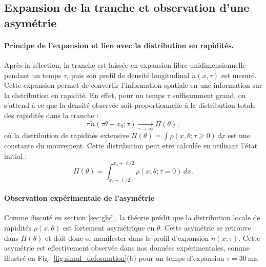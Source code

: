 \subsection{Expansion de la tranche et observation d’une asymétrie}

\paragraph{Principe de l’expansion et lien avec la distribution en rapidités.}

Après la sélection, la tranche est laissée en expansion libre unidimensionnelle pendant un temps $\tau$, puis son profil de densité longitudinal $\tilde{n}(x,\tau)$ est mesuré. Cette expansion permet de convertir l’information spatiale en une information sur la distribution en rapidité. En effet, pour un temps $\tau$ suffisamment grand, on s’attend à ce que la densité observée soit proportionnelle à la distribution totale des rapidités dans la tranche :
\begin{equation}
\tau\, \tilde{n}(\tau \theta - x_0 ; \tau) \underset{\tau \to \infty}{\longrightarrow} \Pi(\theta),
\end{equation}
où la distribution de rapidités extensive $\Pi(\theta) = \int \rho(x, \theta ; \tau \geq 0)\, dx $ est une constante du mouvement. Cette distribution peut etre calculée en utilisant l'état initial :
\begin{equation}\label{chap6:eq.Pi.1}
\Pi(\theta)  = \int_{x_0 - \ell/2}^{x_0 + \ell/2} \rho(x, \theta ; \tau = 0)\, dx.
\end{equation}

\paragraph{Observation expérimentale de l’asymétrie}
Comme discuté en section \ref{sec:ghd}, la théorie prédit que la distribution locale de rapidités $\rho(x,\theta)$ est fortement asymétrique en $\theta$. Cette asymétrie se retrouve dans $\Pi(\theta)$ et doit donc se manifester dans le profil d’expansion $\tilde{n}(x,\tau)$. Cette asymétrie est effectivement observée dans nos données expérimentales, comme illustré en Fig.~\ref{fig:simul_deformation}(b) pour un temps d’expansion $\tau = 30~\mathrm{ms}$. 


